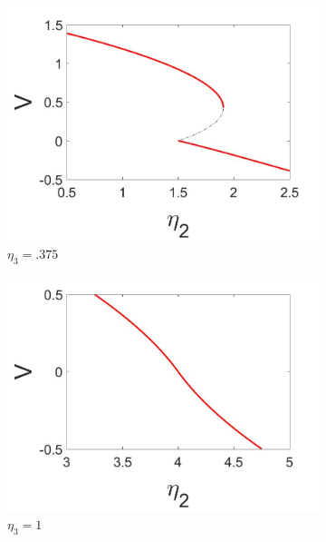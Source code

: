 \begin{figure}[H]
\centering
\begin{subfigure}{.5\textwidth}
 \centering
 \includegraphics[width=\linewidth]{intro/V_bif.jpg}
 \caption{$\eta_3=.375$}
\end{subfigure}%
\begin{subfigure}{.5\textwidth}
 \centering
 \includegraphics[width=\linewidth]{intro/V_bif_collapse.jpg}
 \caption{$\eta_3=1$}
\end{subfigure}
\begin{subfigure}{.5\textwidth}
 \centering

\end{subfigure}
\end{figure}
